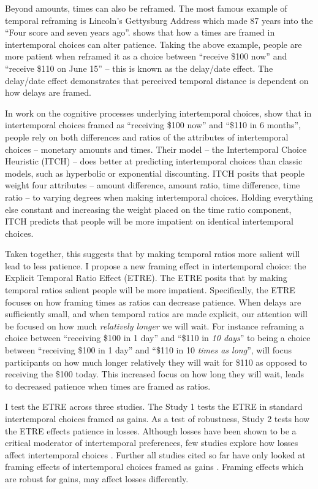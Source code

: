 \documentclass[]{article}
\begin{document}
Beyond amounts, times can also be reframed.
The most famous example of temporal reframing is  Lincoln's Gettysburg Address which made 87 years into the ``Four score and seven years ago''.
 shows that how a times are framed in intertemporal choices can alter patience. 
Taking the above example, people are more patient when reframed it as a choice between  ``receive \$100 now'' and ``receive \$110 on June 15'' -- this is known as the delay/date effect. 
The delay/date effect demonstrates that perceived temporal distance is dependent on how delays are framed. 

In work on the cognitive processes underlying intertemporal choices,  show that in intertemporal choices framed as ``receiving \$100 now'' and ``\$110 in 6 months'', people rely on both differences and ratios of the  attributes of intertemporal choices -- monetary amounts and times.
Their model -- the Intertemporal Choice Heuristic (ITCH) -- does better at predicting intertemporal choices than classic models, such as hyperbolic or exponential discounting. 
ITCH posits that people weight four attributes -- amount difference, amount ratio, time difference, time ratio --  to varying degrees when making intertemporal choices. 
Holding everything else constant and increasing the weight placed on the time ratio component, ITCH predicts that people will be more impatient on identical intertemporal choices. 

Taken together, this suggests that by making temporal ratios more salient will lead to less patience.
I propose a new framing effect in intertemporal choice: the Explicit Temporal Ratio Effect (ETRE). 
The ETRE posits that by making temporal ratios salient people will be more impatient. 
Specifically, the ETRE focuses on how framing times as ratios can decrease patience.
When delays are sufficiently small, and when temporal ratios are made explicit, our attention will be focused on how much \textit{relatively longer} we will wait. 
For instance reframing a choice between ``receiving \$100  in 1 day'' and ``\$110 in \textit{10 days}'' to being a choice between ``receiving \$100  in 1 day'' and ``\$110 in 10 \textit{times as long}'', will focus participants on how much longer relatively they will wait for \$110 as opposed to receiving the \$100 today.
This increased focus on how long they will wait, leads to decreased patience when times are framed as ratios.

I test the ETRE across three studies. 
The Study 1 tests the ETRE in standard intertemporal choices framed as gains.
As a test of robustness, Study 2 tests how the ETRE effects patience in losses. 
Although losses have been shown to be a critical moderator of intertemporal preferences, few studies explore how losses affect intertemporal choices \cite{Hardisty2013, Hardisty2015}.
Further all studies cited so far have only looked at framing effects of intertemporal choices framed as gains \cite{Magen2008, Read2005, Read2013}. 
Framing effects which are robust for gains, may affect losses differently.  
\end{document}
